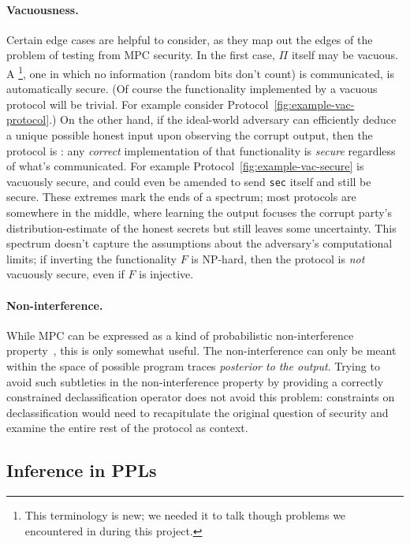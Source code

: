 \documentclass[acmlarge, manuscript, screen, review, anonymous, table]{acmart}
\newcommand{\inlinecode}[2][cho]{\lstinline[language=#1]{#2}}
\begin{document}
\paragraph{Vacuousness.}
Certain edge cases are helpful to consider, as they map out the edges of the problem of testing from MPC security.
In the first case, $Π$ itself may be vacuous.
A \footnote{
    This terminology is new; we needed it to talk though problems we encountered in during this project.
}, one in which no information (random bits don't count) is communicated, is automatically secure.
(Of course the functionality implemented by a vacuous protocol will be trivial.
For example consider Protocol~\ref{fig:example-vac-protocol}.)
On the other hand, if the ideal-world adversary can efficiently deduce a unique possible honest input upon observing the corrupt output,
then the protocol is :
any \emph{correct} implementation of that functionality is \emph{secure} regardless of what's communicated.
For example Protocol~\ref{fig:example-vac-secure} is vacuously secure,
and could even be amended to send \inlinecode{sec} itself and still be secure.
These extremes mark the ends of a spectrum; most protocols are somewhere in the middle,
where learning the output focuses the corrupt party's distribution-estimate of the honest secrets but still leaves some uncertainty.
This spectrum doesn't capture the assumptions about the adversary's computational limits;
if inverting the functionality $F$ is NP-hard, then the protocol is \emph{not} vacuously secure, even if $F$ is injective.

\paragraph{Non-interference.}
While MPC can be expressed as a kind of probabilistic non-interference property~\cite{haagh2018computer, almeida2018enforcing}, this is only somewhat useful.
The non-interference can only be meant within the space of possible program traces \emph{posterior to the output}.
Trying to avoid such subtleties in the non-interference property by providing a correctly constrained declassification operator
does not avoid this problem: constraints on declassification would need to recapitulate the original question of security
and examine the entire rest of the protocol as context.

\subsection{Inference in PPLs}
\end{document}
